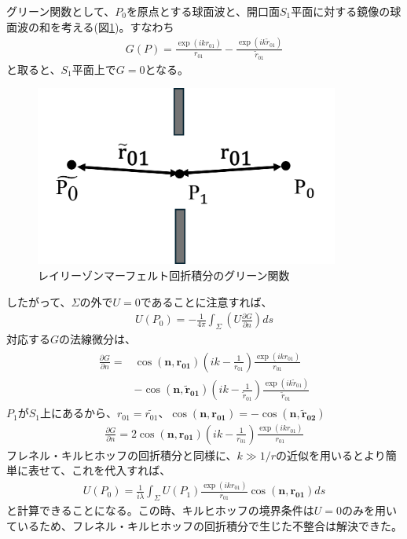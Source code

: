 \documentclass[a4paper,11pt,uplatex]{jsbook}
\begin{document}
グリーン関数として、$P_0$を原点とする球面波と、開口面$S_1$平面に対する鏡像の球面波の和を考える(図\ref{fig:diff_ray})。すなわち
\begin{eqnarray}
  G(P) = \frac{\exp(ikr_{01})}{r_{01}} -\frac{\exp(ik\tilde{r}_{01})}{\tilde{r}_{01}}
\end{eqnarray}
と取ると、$S_1$平面上で$G =0$となる。
\begin{figure}[h]
  \centering
  \includegraphics[width=10cm]{image/2-diffraction_ray.png}
  \caption[レイリーゾンマーフェルト積分の座標系]{レイリーゾンマーフェルト回折積分のグリーン関数}\label{fig:diff_ray}
\end{figure}
したがって、$\Sigma$の外で$U =0 $であることに注意すれば、
\begin{eqnarray}
  U(P_0) = -\frac{1}{4\pi}\int_{\Sigma} \left( U\frac{\partial G}{\partial n} \right) ds
\end{eqnarray}
対応する$G$の法線微分は、
\begin{eqnarray}
  \begin{split}
  \frac{\partial G}{\partial n} = &\cos(\bm{n},\bm{r_{01}})\left(ik - \frac{1}{r_{01}}\right)\frac{\exp(ikr_{01})}{r_{01}} \\
  &- \cos(\bm{n},\bm{\tilde{r}_{01}})\left(ik - \frac{1}{\tilde{r}_{01}}\right)\frac{\exp(ik\tilde{r}_{01})}{\tilde{r}_{01}}
  \end{split}
\end{eqnarray}
$P_1$が$S_1$上にあるから、$r_{01} = \tilde{r_{01}}$、$\cos(\bm{n},\bm{r_{01}}) = -\cos(\bm{n},\bm{\tilde{r}_{02}})$
\begin{eqnarray}
  \frac{\partial G}{\partial n} = 2\cos(\bm{n},\bm{r_{01}})\left(ik - \frac{1}{r_{01}}\right)\frac{\exp(ikr_{01})}{r_{01}}
\end{eqnarray}
フレネル・キルヒホッフの回折積分と同様に、$k \gg 1/r$の近似を用いるとより簡単に表せて、これを代入すれば、
\begin{eqnarray}
  U(P_0) = \frac{1}{i\lambda}\int_{\Sigma} U(P_1)\frac{\exp(ikr_{01})}{r_{01}}\cos(\bm{n},\bm{r_{01}})ds
\end{eqnarray}
と計算できることになる。この時、キルヒホッフの境界条件は$U=0$のみを用いているため、フレネル・キルヒホッフの回折積分で生じた不整合は解決できた。
\end{document}
